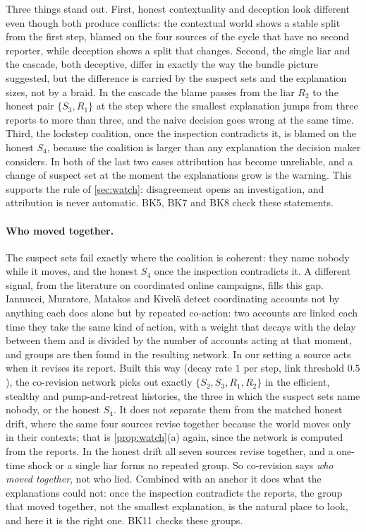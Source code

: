 \documentclass[11pt]{article}
\theoremstyle{definition}\newtheorem{definition}[theorem]{Definition}\newtheorem{remark}[theorem]{Remark}\newtheorem{example}[theorem]{Example}\newtheorem{problem}[theorem]{Open problem}\crefname{problem}{Problem}{Problems}
\begin{document}
Three things stand out. First, honest contextuality and deception look different even though both produce conflicts: the contextual world shows a stable split from the first step, blamed on the four sources of the cycle that have no second reporter, while deception shows a split that changes. Second, the single liar and the cascade, both deceptive, differ in exactly the way the bundle picture suggested, but the difference is carried by the suspect sets and the explanation sizes, not by a braid. In the cascade the blame passes from the liar $R_2$ to the honest pair $\{S_3,R_1\}$ at the step where the smallest explanation jumps from three reports to more than three, and the naive decision goes wrong at the same time. Third, the lockstep coalition, once the inspection contradicts it, is blamed on the honest $S_4$, because the coalition is larger than any explanation the decision maker considers. In both of the last two cases attribution has become unreliable, and a change of suspect set at the moment the explanations grow is the warning. This supports the rule of \cref{sec:watch}: disagreement opens an investigation, and attribution is never automatic. BK5, BK7 and BK8 check these statements.

\paragraph{Who moved together.} The suspect sets fail exactly where the coalition is coherent: they name nobody while it moves, and the honest $S_4$ once the inspection contradicts it. A different signal, from the literature on coordinated online campaigns, fills this gap. Iannucci, Muratore, Matakos and Kivel\"a \cite{Iannucci2025} detect coordinating accounts not by anything each does alone but by repeated co-action: two accounts are linked each time they take the same kind of action, with a weight that decays with the delay between them and is divided by the number of accounts acting at that moment, and groups are then found in the resulting network. In our setting a source acts when it revises its report. Built this way (decay rate $1$ per step, link threshold $0.5$), the co-revision network picks out exactly $\{S_2,S_3,R_1,R_2\}$ in the efficient, stealthy and pump-and-retreat histories, the three in which the suspect sets name nobody, or the honest $S_4$. It does not separate them from the matched honest drift, where the same four sources revise together because the world moves only in their contexts; that is \cref{prop:watch}(a) again, since the network is computed from the reports. In the honest drift all seven sources revise together, and a one-time shock or a single liar forms no repeated group. So co-revision says \emph{who moved together}, not who lied. Combined with an anchor it does what the explanations could not: once the inspection contradicts the reports, the group that moved together, not the smallest explanation, is the natural place to look, and here it is the right one. BK11 checks these groups.
\end{document}
